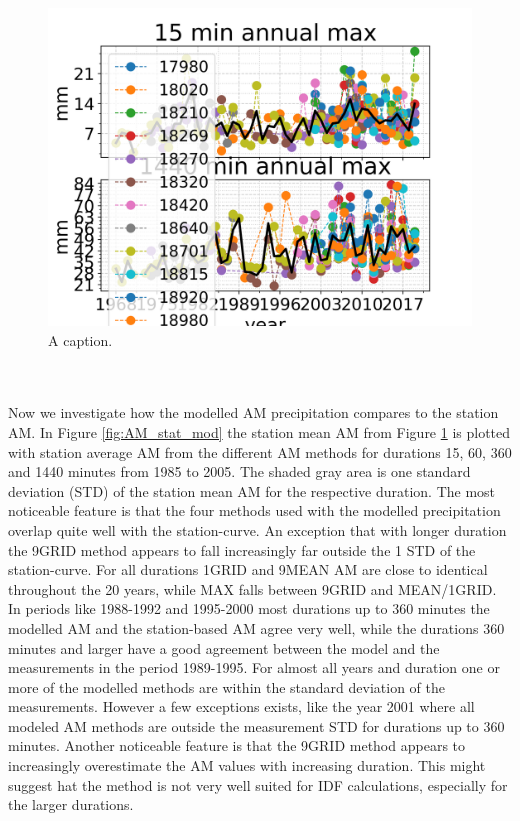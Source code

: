 \begin{figure}[hbt!]
    \centering
    \includegraphics[scale=0.8]{figures/AM_stations.png}
    \caption{A caption.}
    \label{fig:AM_stations}
\end{figure}
\\
\\
Now we investigate how the modelled AM precipitation compares to the station AM. In Figure \ref{fig:AM_stat_mod} the station mean AM from Figure \ref{fig:AM_stations} is plotted with station average AM from the different AM methods for durations 15, 60, 360 and 1440 minutes from 1985 to 2005. The shaded gray area is one standard deviation (STD) of the station mean AM for the respective duration. The most noticeable feature is that the four methods used with the modelled precipitation overlap quite well with the station-curve. An exception that with longer duration the 9GRID method appears to fall increasingly far outside the 1 STD of the station-curve. For all durations 1GRID and 9MEAN AM are close to identical throughout the 20 years, while MAX falls between 9GRID and MEAN/1GRID. In periods like 1988-1992 and 1995-2000 most durations up to 360 minutes the modelled AM and the station-based AM agree very well, while the durations 360 minutes and larger have a good agreement between the model and the measurements in the period 1989-1995. For almost all years and duration one or more of the modelled methods are within the standard deviation of the measurements. However a few exceptions exists, like the year 2001 where all modeled AM methods are outside the measurement STD for durations up to 360 minutes. Another noticeable feature is that the 9GRID method appears to increasingly overestimate the AM values with increasing duration. This might suggest hat the method is not very well suited for IDF calculations, especially for the larger durations.   


